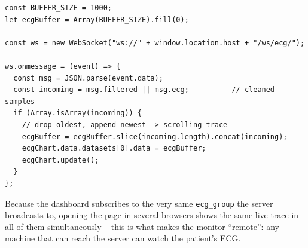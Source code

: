 \begin{lstlisting}[style=js,caption={Dashboard WebSocket handler and buffer update (abridged).}]
const BUFFER_SIZE = 1000;
let ecgBuffer = Array(BUFFER_SIZE).fill(0);

const ws = new WebSocket("ws://" + window.location.host + "/ws/ecg/");

ws.onmessage = (event) => {
  const msg = JSON.parse(event.data);
  const incoming = msg.filtered || msg.ecg;          // cleaned samples
  if (Array.isArray(incoming)) {
    // drop oldest, append newest -> scrolling trace
    ecgBuffer = ecgBuffer.slice(incoming.length).concat(incoming);
    ecgChart.data.datasets[0].data = ecgBuffer;
    ecgChart.update();
  }
};
\end{lstlisting}

Because the dashboard subscribes to the very same \texttt{ecg\_group} the server
broadcasts to, opening the page in several browsers shows the same live trace in
all of them simultaneously -- this is what makes the monitor ``remote'': any
machine that can reach the server can watch the patient's ECG.
